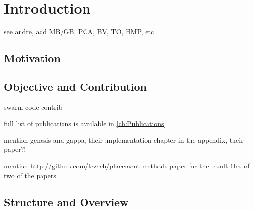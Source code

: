 
\chapter{Introduction}
\label{ch:Introduction}


 see andre, add MB/GB, PCA,
BV, TO, HMP, etc



\section{Motivation}
\label{ch:Introduction:sec:Motivation}


\section{Objective and Contribution}
\label{ch:Introduction:sec:ObjectiveContribution}

swarm code contrib \cite{Mahe2014,Mahe2015}

full list of publications is available in \ref{ch:Publications}

mention genesis and gappa, their implementation chapter in the appendix,
their paper?!

mention  \url{http://github.com/lczech/placement-methods-paper} for the result files of two of the papers


\section{Structure and Overview}
\label{ch:Introduction:sec:StructureOverview}
